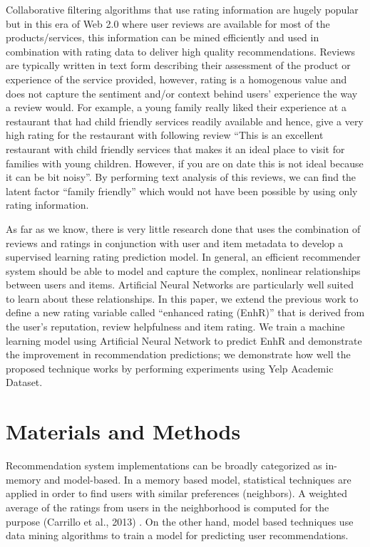 \documentclass[12pt]{article}
\begin{document}
Collaborative filtering algorithms that use rating information are hugely popular but in this era of Web 2.0 where user reviews are available for most of the products/services, this information can be mined efficiently and used in combination with rating data to deliver high quality recommendations. Reviews are typically written in text form describing their assessment of the product or experience of the service provided, however, rating is a homogenous value and does not capture the sentiment and/or context behind users' experience the way a review would. For example, a young family really liked their experience at a restaurant that had child friendly services readily available and hence, give a very high rating for the restaurant with following review ``This is an excellent restaurant with child friendly services that makes it an ideal place to visit for families with young children. However, if you are on date this is not ideal because it can be bit noisy''. By performing text analysis of this reviews, we can find the latent factor ``family friendly'' which would not have been possible by using only rating information. 

As far as we know, there is very little research done that uses the combination of reviews and ratings in conjunction with user and item metadata to develop a supervised learning rating prediction model. In general, an efficient recommender system should be able to model and capture the complex, nonlinear relationships between users and items. Artificial Neural Networks are particularly well suited to learn about these relationships. In this paper, we extend the previous work to define a new rating variable called ``enhanced rating (EnhR)'' that is derived from the user's reputation, review helpfulness and item rating. We train a machine learning model using Artificial Neural Network to predict EnhR and demonstrate the improvement in recommendation predictions; we demonstrate how well the proposed technique works by performing experiments using Yelp Academic Dataset.

\newpage\section{Materials and Methods}

Recommendation system implementations can be broadly categorized as in-memory and model-based. In a memory based model, statistical techniques are applied in order to find users with similar preferences (neighbors). A weighted average of the ratings from users in the neighborhood is computed for the purpose (Carrillo et al., 2013) \cite{carrillo}. On the other hand, model based techniques use data mining algorithms to train a model for predicting user recommendations.
\end{document}
